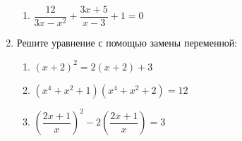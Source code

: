\documentclass[12pt, a4paper]{article}
\begin{document}
\begin{enumerate}
\begin{multicols}{2}
\begin{enumerate}[label=\asbuk*)]
			\item $\dfrac{12}{3x-x^2}+\dfrac{3x+5}{x-3}+1=0$
		\end{enumerate}
	\end{multicols}
	\item Решите уравнение с помощью замены переменной:
	\begin{multicols}{2}
		\begin{enumerate}[label=\asbuk*)]
			\item $(x+2)^2=2(x+2)+3$
			\item $(x^4+x^2+1)(x^4+x^2+2)=12$
			\item $\left(\dfrac{2x+1}{x}\right)^2-2\left(\dfrac{2x+1}{x}\right)=3$
		\end{enumerate}
	\end{multicols}
\end{enumerate}
\end{document}
